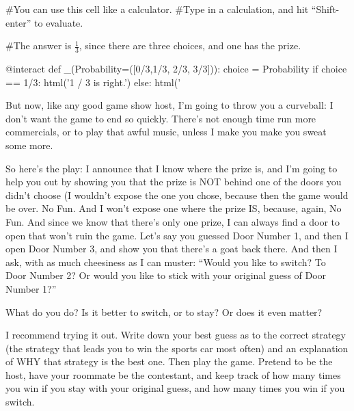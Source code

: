 \begin{sageverbatim}
#You can use this cell like a calculator.  
#Type in a calculation, and hit ``Shift-enter'' to evaluate.
\end{sageverbatim}


\begin{sageverbatim}
#The answer is $\frac{1}{3}$, since there are three choices, and one has the prize.
\end{sageverbatim}

\begin{sageverbatim}
@interact
def _(Probability=([0/3,1/3, 2/3, 3/3])):
    choice = Probability
    if choice == 1/3:
         html('1 / 3 is right.')
    else:
         html('%
\end{sageverbatim}    





But now, like any good game show host, I'm going to throw you a
curveball: I don't want the game to end so quickly.  There's not
enough time run more commercials, or to play that awful music, unless
I make you make you sweat some more. 


So here's the play: I announce that I know where the prize is, and I'm
going to help you out by showing you that the prize is NOT behind one
of the doors you didn't choose (I wouldn't expose the one you chose,
because then the game would be over.  No Fun.  And I won't expose one
where the prize IS, because, again, No Fun. And since we know that
there's only one prize, I can always find a door to open that won't
ruin the game.  Let's say you guessed Door Number 1, and then I open
Door Number 3, and show you that there's a goat back there.  And then
I ask, with as much cheesiness as I can muster: ``Would you like to
switch?  To Door Number 2?  Or would you like to stick with your
original guess of Door Number 1?''


What do you do?  Is it better to switch, or to stay?  Or does it even
matter?


I recommend trying it out.  Write down your best guess as to the
correct strategy (the strategy that leads you to win the sports car
most often) and an explanation of WHY that strategy is the best one.
Then play the game.  Pretend to be the host, have your roommate be the
contestant, and keep track of how many times you win if you stay with
your original guess, and how many times you win if you switch.


